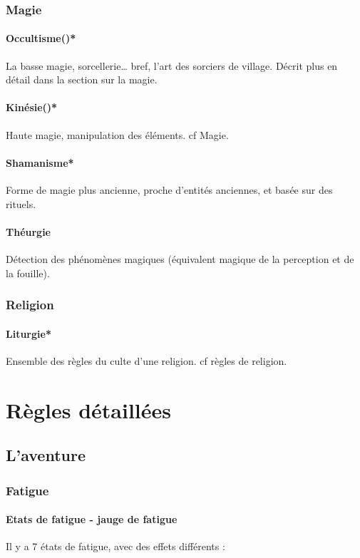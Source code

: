 \documentclass[10pt,a4paper,twocolumn]{book}
\begin{document}
\subsection{Magie}
\subsubsection{Occultisme()*}
La basse magie, sorcellerie… bref, l’art des sorciers de village. Décrit plus en détail dans la section sur la magie.
\subsubsection{Kinésie()*}
Haute magie, manipulation des éléments. cf Magie.
\subsubsection{Shamanisme*}
Forme de magie plus ancienne, proche d’entités anciennes, et basée sur des rituels.
\subsubsection{Théurgie}
Détection des phénomènes magiques (équivalent magique de la perception et de la fouille).
\subsection{Religion}
\subsubsection{Liturgie*}
Ensemble des règles du culte d’une religion. cf règles de religion.

\chapter{Règles détaillées}

\section{L'aventure}
\subsection{Fatigue}
\subsubsection{Etats de fatigue - jauge de fatigue}
Il y  a 7 états de fatigue, avec des effets différents :
\end{document}
